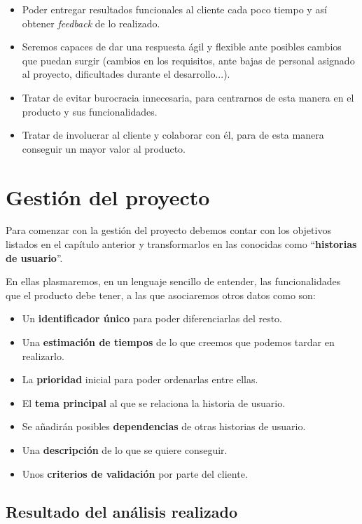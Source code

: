 \documentclass{\ClassPath/viu-tfm-template}
\begin{document}
\begin{itemize}
    \item Poder entregar resultados funcionales al cliente cada poco tiempo y así obtener \textit{feedback} de lo realizado.
    \item Seremos capaces de dar una respuesta ágil y flexible ante posibles cambios que puedan surgir (cambios en los requisitos, ante bajas de personal asignado al proyecto, dificultades durante el desarrollo...).
    \item Tratar de evitar burocracia innecesaria, para centrarnos de esta manera en el producto y sus funcionalidades.
    \item Tratar de involucrar al cliente y colaborar con él, para de esta manera conseguir un mayor valor al producto.
\end{itemize}

\section{Gestión del proyecto}

Para comenzar con la gestión del proyecto debemos contar con los objetivos listados en el capítulo anterior y transformarlos en las conocidas como “\textbf{historias de usuario}”.

En ellas plasmaremos, en un lenguaje sencillo de entender, las funcionalidades que el producto debe tener, a las que asociaremos otros datos como son:

\begin{itemize}
    \item Un \textbf{identificador único} para poder diferenciarlas del resto.
    \item Una \textbf{estimación de tiempos} de lo que creemos que podemos tardar en realizarlo.
    \item La \textbf{prioridad} inicial para poder ordenarlas entre ellas.
    \item El \textbf{tema principal} al que se relaciona la historia de usuario.
    \item Se añadirán posibles \textbf{dependencias} de otras historias de usuario.
    \item Una \textbf{descripción} de lo que se quiere conseguir.
    \item Unos \textbf{criterios de validación} por parte del cliente.
\end{itemize}

\subsection{Resultado del análisis realizado}
\end{document}
